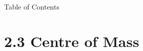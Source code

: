 

 \begin{frame}{Table of Contents }
\mapofcontentsB{\bc}
 \end{frame}
\section{2.3 Centre of Mass}

